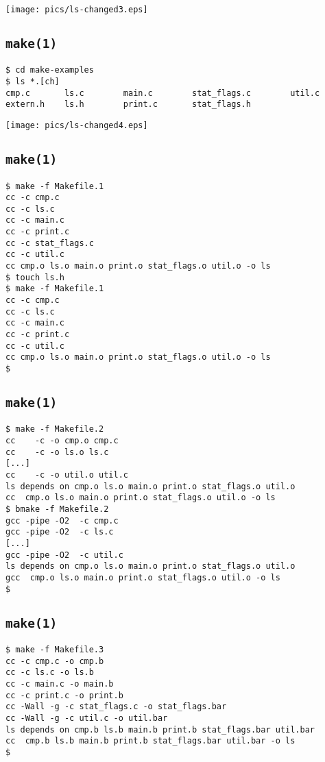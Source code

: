 \documentclass[xga]{xdvislides}
\begin{document}
\begin{center}
	\texttt{[image: pics/ls-changed3.eps]}
\end{center}

\subsection{{\tt make(1)}}

\begin{verbatim}
$ cd make-examples
$ ls *.[ch]
cmp.c       ls.c        main.c        stat_flags.c        util.c
extern.h    ls.h        print.c       stat_flags.h
\end{verbatim}

\begin{center}
	\texttt{[image: pics/ls-changed4.eps]}
\end{center}

\subsection{{\tt make(1)}}
\begin{verbatim}
$ make -f Makefile.1
cc -c cmp.c
cc -c ls.c
cc -c main.c
cc -c print.c
cc -c stat_flags.c
cc -c util.c
cc cmp.o ls.o main.o print.o stat_flags.o util.o -o ls
$ touch ls.h
$ make -f Makefile.1
cc -c cmp.c
cc -c ls.c
cc -c main.c
cc -c print.c
cc -c util.c
cc cmp.o ls.o main.o print.o stat_flags.o util.o -o ls
$
\end{verbatim}

\subsection{{\tt make(1)}}
\begin{verbatim}
$ make -f Makefile.2
cc    -c -o cmp.o cmp.c
cc    -c -o ls.o ls.c
[...]
cc    -c -o util.o util.c
ls depends on cmp.o ls.o main.o print.o stat_flags.o util.o
cc  cmp.o ls.o main.o print.o stat_flags.o util.o -o ls
$ bmake -f Makefile.2
gcc -pipe -O2  -c cmp.c
gcc -pipe -O2  -c ls.c
[...]
gcc -pipe -O2  -c util.c
ls depends on cmp.o ls.o main.o print.o stat_flags.o util.o
gcc  cmp.o ls.o main.o print.o stat_flags.o util.o -o ls
$
\end{verbatim}

\subsection{{\tt make(1)}}
\begin{verbatim}
$ make -f Makefile.3
cc -c cmp.c -o cmp.b
cc -c ls.c -o ls.b
cc -c main.c -o main.b
cc -c print.c -o print.b
cc -Wall -g -c stat_flags.c -o stat_flags.bar
cc -Wall -g -c util.c -o util.bar
ls depends on cmp.b ls.b main.b print.b stat_flags.bar util.bar
cc  cmp.b ls.b main.b print.b stat_flags.bar util.bar -o ls
$
\end{verbatim}
\end{document}
